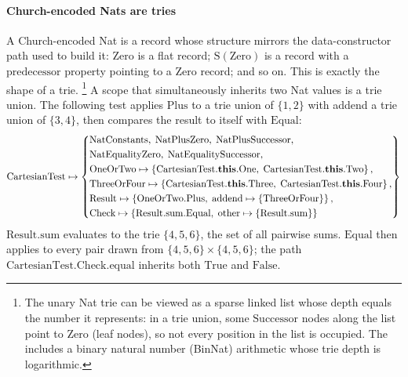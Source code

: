 \paragraph{Church-encoded Nats are tries}
\label{sec:case-study-cartesian}
A Church-encoded Nat is a record whose structure mirrors the
data-constructor path used to build it: $\mathrm{Zero}$ is a flat record;
$\mathrm{S}(\mathrm{Zero})$ is a record with a $\mathrm{predecessor}$
property pointing to a $\mathrm{Zero}$ record; and so on.
This is exactly the shape of a trie.%
\footnote{
  The unary Nat trie can be viewed as a sparse linked list
  whose depth equals the number it represents:
  in a trie union, some $\mathrm{Successor}$ nodes along
  the list point to $\mathrm{Zero}$ (leaf nodes),
  so not every position in the list is occupied.
  The includes a binary natural number
  (BinNat) arithmetic whose trie depth is logarithmic.
}
A scope that simultaneously inherits two Nat values is a trie union.
The following test applies $\mathrm{Plus}$ to a trie union of $\{1,2\}$
with addend a trie union of $\{3,4\}$, then compares the result to itself
with $\mathrm{Equal}$:
\[
  \mathrm{CartesianTest} \mapsto \left\{
    \begin{aligned}
      &\mathrm{NatConstants},\; \mathrm{NatPlusZero},\; \mathrm{NatPlusSuccessor},\\
      &\mathrm{NatEqualityZero},\; \mathrm{NatEqualitySuccessor},\\
      &\mathrm{OneOrTwo} \mapsto \left\{\mathrm{CartesianTest}.\mathbf{this}.\mathrm{One},\; \mathrm{CartesianTest}.\mathbf{this}.\mathrm{Two}\right\},\\
      &\mathrm{ThreeOrFour} \mapsto \left\{\mathrm{CartesianTest}.\mathbf{this}.\mathrm{Three},\; \mathrm{CartesianTest}.\mathbf{this}.\mathrm{Four}\right\},\\
      &\mathrm{Result} \mapsto \left\{\mathrm{OneOrTwo}.\mathrm{Plus},\; \mathrm{addend} \mapsto \{\mathrm{ThreeOrFour}\}\right\},\\
      &\mathrm{Check} \mapsto \left\{\mathrm{Result}.\mathrm{sum}.\mathrm{Equal},\; \mathrm{other} \mapsto \{\mathrm{Result}.\mathrm{sum}\}\right\}
  \end{aligned}\right\}
\]
$\mathrm{Result}.\mathrm{sum}$ evaluates to the trie $\{4,5,6\}$, the set of all pairwise sums.
$\mathrm{Equal}$ then applies to every pair drawn from $\{4,5,6\} \times \{4,5,6\}$;
the path $\mathrm{CartesianTest}.\mathrm{Check}.\mathrm{equal}$
inherits both $\mathrm{True}$ and $\mathrm{False}$.
